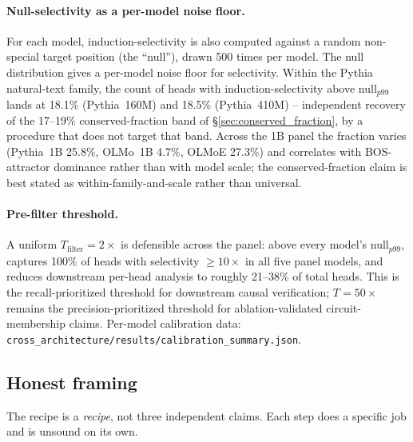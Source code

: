\documentclass[11pt]{article}
\begin{document}
\paragraph{Null-selectivity as a per-model noise floor.} For each model, induction-selectivity is also computed against a random non-special target position (the ``null''), drawn 500 times per model. The null distribution gives a per-model noise floor for selectivity. Within the Pythia natural-text family, the count of heads with induction-selectivity above null$_{p99}$ lands at 18.1\% (Pythia~160M) and 18.5\% (Pythia~410M) -- independent recovery of the 17--19\% conserved-fraction band of \S\ref{sec:conserved_fraction}, by a procedure that does not target that band. Across the 1B panel the fraction varies (Pythia~1B 25.8\%, OLMo~1B 4.7\%, OLMoE 27.3\%) and correlates with BOS-attractor dominance rather than with model scale; the conserved-fraction claim is best stated as within-family-and-scale rather than universal.

\paragraph{Pre-filter threshold.} A uniform $T_{\mathrm{filter}} = 2\times$ is defensible across the panel: above every model's null$_{p99}$, captures 100\% of heads with selectivity $\geq 10\times$ in all five panel models, and reduces downstream per-head analysis to roughly 21--38\% of total heads. This is the recall-prioritized threshold for downstream causal verification; $T = 50\times$ remains the precision-prioritized threshold for ablation-validated circuit-membership claims. Per-model calibration data: \verb|cross_architecture/results/calibration_summary.json|.

\subsection{Honest framing}
\label{sec:framing}

The recipe is a \emph{recipe}, not three independent claims. Each step does a specific job and is unsound on its own.
\end{document}
